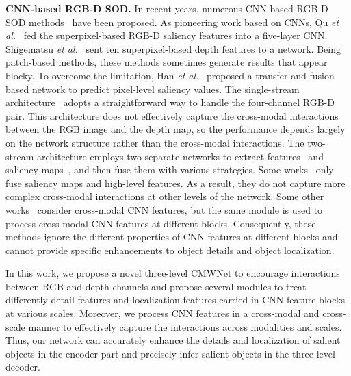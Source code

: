 \documentclass[runningheads]{llncs}
\newcommand{\etal}{\emph{et al.}}
\begin{document}
\noindent\textbf{CNN-based RGB-D SOD.}
In recent years, numerous CNN-based RGB-D SOD methods~\cite{Qu2017DF,Shigematsu2017ICCVW,Han2018CTMF,Chen2018PCF,2019PDNet,Chen2019MMCI,Ding2019JVCIR,Chen2019TANet,Zhao2019CPFP,Wang2019AFNet,Liu2019SRCNN,Fan2019D3Net}
have been proposed.
As pioneering work based on CNNs, Qu \etal~\cite{Qu2017DF}
fed the superpixel-based RGB-D saliency features into a
five-layer CNN.
Shigematsu \etal~\cite{Shigematsu2017ICCVW} sent
ten superpixel-based depth features to a network.
Being patch-based methods, these methods sometimes generate results that appear blocky.
To overcome the limitation, Han \etal~\cite{Han2018CTMF} proposed a transfer and fusion
based network to predict pixel-level saliency values.
The single-stream architecture~\cite{Liu2019SRCNN,Fan2019D3Net}
adopts a straightforward way to handle the four-channel RGB-D pair.
This architecture does not effectively capture the
cross-modal interactions between the RGB image and
the depth map, so the performance depends largely
on the network structure rather than the cross-modal interactions.
The two-stream architecture employs two separate networks
to extract features~\cite{Han2018CTMF,Chen2018PCF,2019PDNet,Chen2019MMCI}
and saliency maps~\cite{Ding2019JVCIR,Wang2019AFNet},
and then fuse them with various strategies.
Some works~\cite{Ding2019JVCIR,Wang2019AFNet,Han2018CTMF,2019PDNet}
only fuse saliency maps and high-level features.
As a result, they do not capture more complex cross-modal
interactions at other levels of the network.
Some other works~\cite{Chen2018PCF,Chen2019TANet} consider
cross-modal CNN features, but the same module is used to
process cross-modal CNN features at different blocks.
Consequently, these methods ignore the different properties
of CNN features at different blocks and cannot provide specific enhancements to
object details and object localization.


In this work, we propose a novel three-level CMWNet to encourage interactions between RGB and depth channels and propose several modules to treat differently detail features and localization features carried in CNN feature blocks at various scales.
Moreover, we process CNN features in a cross-modal and cross-scale manner
to effectively capture the interactions across modalities and scales.
Thus, our network can accurately enhance the details and localization of salient objects in the
encoder part and precisely infer salient objects in the three-level decoder.
\end{document}
